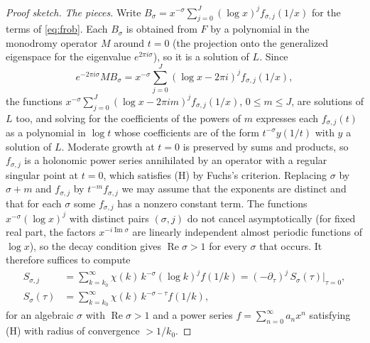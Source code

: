 \documentclass[11pt,reqno]{amsart}
\theoremstyle{definition}
\theoremstyle{remark}
\begin{document}
\begin{proof}[Proof sketch]
\emph{The pieces.} Write $B_\sigma = x^{-\sigma}\sum_{j=0}^{J}(\log x)^jf_{\sigma,j}(1/x)$ for the terms of \eqref{eq:frob}. Each
$B_\sigma$ is obtained from $F$ by a polynomial in the monodromy operator $M$ around $t = 0$ (the projection onto the
generalized eigenspace for the eigenvalue $e^{2\pi i\sigma}$), so it is a solution of $L$. Since
\[
  e^{-2\pi i\sigma}MB_\sigma = x^{-\sigma}\sum_{j=0}^{J}(\log x - 2\pi i)^jf_{\sigma,j}(1/x),
\]
the functions $x^{-\sigma}\sum_{j=0}^{J}(\log x - 2\pi i m)^jf_{\sigma,j}(1/x)$, $0 \le m \le J$, are solutions of $L$ too, and solving for the
coefficients of the powers of $m$ expresses each $f_{\sigma,j}(t)$ as a polynomial in $\log t$ whose coefficients are
of the form $t^{-\sigma}y(1/t)$ with $y$ a solution of $L$. Moderate growth at $t = 0$ is preserved by sums and
products, so $f_{\sigma,j}$ is a holonomic power series annihilated by an operator with a regular singular point at
$t = 0$, which satisfies (H) by Fuchs's criterion. Replacing $\sigma$ by $\sigma + m$ and $f_{\sigma,j}$ by
$t^{-m}f_{\sigma,j}$ we may assume that the exponents are distinct and that for each $\sigma$ some $f_{\sigma,j}$
has a nonzero constant term. The functions $x^{-\sigma}(\log x)^j$ with distinct pairs $(\sigma, j)$ do not cancel
asymptotically (for fixed real part, the factors $x^{-i\operatorname{Im}\sigma}$ are linearly independent almost
periodic functions of $\log x$), so the decay condition gives $\operatorname{Re}\sigma > 1$ for every $\sigma$ that occurs.
It therefore suffices to compute
\begin{align*}
  S_{\sigma,j} &= \sum_{k=k_0}^{\infty}\chi(k)\,k^{-\sigma}(\log k)^jf(1/k) = (-\partial_\tau)^j\, S_\sigma(\tau)\big|_{\tau=0},\\
  S_\sigma(\tau) &= \sum_{k=k_0}^{\infty}\chi(k)\,k^{-\sigma-\tau}f(1/k),
\end{align*}
for an algebraic $\sigma$ with $\operatorname{Re}\sigma > 1$ and a power series $f = \sum_{n=0}^{\infty}a_nx^n$ satisfying (H)
with radius of convergence $> 1/k_0$.


\end{proof}
\end{document}
